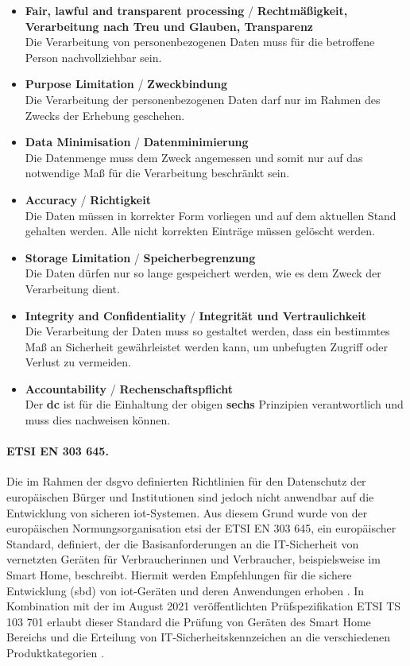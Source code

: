 \begin{itemize}
    \item \textbf{Fair, lawful and transparent processing} / \textbf{Rechtmäßigkeit, Verarbeitung nach Treu und Glauben, Transparenz} \\ Die Verarbeitung von personenbezogenen Daten muss für die betroffene Person nachvollziehbar sein.
    \item \textbf{Purpose Limitation} / \textbf{Zweckbindung} \\ Die Verarbeitung der personenbezogenen Daten darf nur im Rahmen des Zwecks der Erhebung geschehen.
    \item \textbf{Data Minimisation} / \textbf{Datenminimierung} \\ Die Datenmenge muss dem Zweck angemessen und somit nur auf das notwendige Maß für die Verarbeitung beschränkt sein.
    \item \textbf{Accuracy} / \textbf{Richtigkeit} \\ Die Daten müssen in korrekter Form vorliegen und auf dem aktuellen Stand gehalten werden. Alle nicht korrekten Einträge müssen gelöscht werden.
    \item \textbf{Storage Limitation} / \textbf{Speicherbegrenzung} \\ Die Daten dürfen nur so lange gespeichert werden, wie es dem Zweck der Verarbeitung dient.
    \item \textbf{Integrity and Confidentiality} / \textbf{Integrität und Vertraulichkeit} \\ Die Verarbeitung der Daten muss so gestaltet werden, dass ein bestimmtes Maß an Sicherheit gewährleistet werden kann, um unbefugten Zugriff oder Verlust zu vermeiden.
    \item \textbf{Accountability} / \textbf{Rechenschaftspflicht} \\ Der \textbf{\ac{dc}} ist für die Einhaltung der obigen \textbf{sechs} Prinzipien verantwortlich und muss dies nachweisen können.
\end{itemize}

\paragraph{ETSI EN 303 645.}
\label{sec:Grundlagen:para:ETSI EN 303 645}
Die im Rahmen der \ac{dsgvo} definierten Richtlinien für den Datenschutz der europäischen Bürger und Institutionen sind jedoch nicht anwendbar auf die Entwicklung von sicheren \ac{iot}-Systemen. Aus diesem Grund wurde von der europäischen Normungsorganisation \acl{etsi} der ETSI EN 303 645, ein europäischer Standard, definiert, der die Basisanforderungen an die IT-Sicherheit von vernetzten Geräten für Verbraucherinnen und Verbraucher, beispielsweise im Smart Home, beschreibt. Hiermit werden Empfehlungen für die sichere Entwicklung (\acl{sbd}) von \ac{iot}-Geräten und deren Anwendungen erhoben \cite{BSI2020}. In Kombination mit der im August 2021 veröffentlichten Prüfspezifikation ETSI TS 103 701 erlaubt dieser Standard die Prüfung von Geräten des Smart Home Bereichs und die Erteilung von IT-Sicherheitskennzeichen an die verschiedenen Produktkategorien \cite{BSI2022}.


